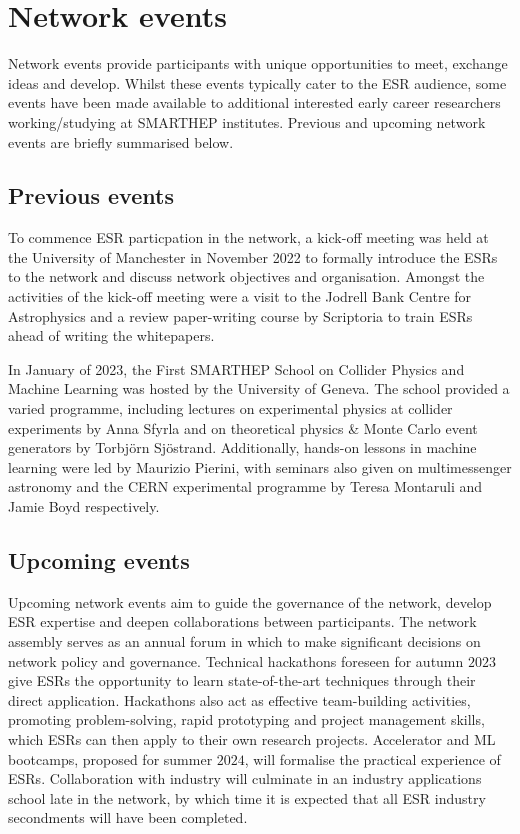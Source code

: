 \section{Network events}
\label{events}
Network events provide participants with unique opportunities to meet, exchange ideas and develop. Whilst these events typically cater to the ESR audience, some events have been made available to additional interested early career researchers working/studying at SMARTHEP institutes. Previous and upcoming network events are briefly summarised below.

\subsection{Previous events}
\label{previous-events}
To commence ESR particpation in the network, a kick-off meeting was held at the University of Manchester in November 2022 to formally introduce the ESRs to the network and discuss network objectives and organisation. Amongst the activities of the kick-off meeting were a visit to the Jodrell Bank Centre for Astrophysics and a review paper-writing course by Scriptoria to train ESRs ahead of writing the whitepapers.\par 

In January of 2023, the First SMARTHEP School on Collider Physics and Machine Learning was hosted by the University of Geneva. The school provided a varied programme, including lectures on experimental physics at collider experiments by Anna Sfyrla and on theoretical physics \& Monte Carlo event generators by Torbj\"orn Sj\"ostrand. Additionally, hands-on lessons in machine learning were led by Maurizio Pierini, with seminars also given on multimessenger astronomy and the CERN experimental programme by Teresa Montaruli and Jamie Boyd respectively.

\subsection{Upcoming events}
\label{upcoming-events}
Upcoming network events aim to guide the governance of the network, develop ESR expertise and deepen collaborations between participants. The network assembly serves as an annual forum in which to make significant decisions on network policy and governance. Technical hackathons foreseen for autumn $2023$ give ESRs the opportunity to learn state-of-the-art techniques through their direct application. Hackathons also act as effective team-building activities, promoting problem-solving, rapid prototyping and project management skills, which ESRs can then apply to their own research projects. Accelerator and ML bootcamps, proposed for summer $2024$, will formalise the practical experience of ESRs. Collaboration with industry will culminate in an industry applications school late in the network, by which time it is expected that all ESR industry secondments will have been completed.


